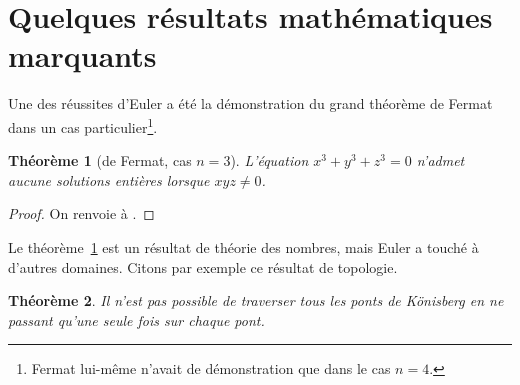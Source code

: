 \documentclass[fleqn,leqno]{article}%
\theoremstyle{plain}
\newtheorem{theoreme}{Théorème}[section]
\theoremstyle{definition}
\theoremstyle{remark}
\numberwithin{equation}{section}
\begin{document}

\section{Quelques résultats mathématiques marquants}

Une des réussites d'Euler a été la démonstration du grand théorème de Fermat dans un cas particulier\footnote{Fermat lui-même n'avait de démonstration que dans le cas $n=4$.}.

\begin{theoreme}[de Fermat, cas $n=3$]\label{theoreme.I}
L'équation $x^3 + y^3 + z^3 = 0$ n'admet aucune solutions entières lorsque $xyz \neq 0$.
\end{theoreme}

\begin{proof}
On renvoie à \cite[p.~134]{Hardy.Wright}.
\end{proof}

Le théorème~\ref{theoreme.I} est un résultat de théorie des nombres, mais Euler a touché à d'autres domaines. Citons par exemple ce résultat de topologie.

\begin{theoreme}
Il n'est pas possible de traverser tous les ponts de Könisberg en ne passant qu'une seule fois sur chaque pont.
\end{theoreme}

%
%
\end{document}
